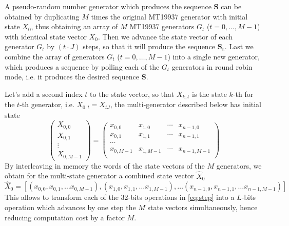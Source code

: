 \documentclass[preprint,1p,times]{elsarticle}
\begin{document}
\noindent A pseudo-random number generator which produces the sequence $\boldsymbol{S}$ can be obtained by duplicating $M$ times the original MT19937 generator with initial state $X_0$, thus obtaining an array of $M$ MT19937 generators $G_t$ ($t=0,\dots, M-1$) with identical state vector $X_0$. Then we advance the state vector of each generator $G_t$ by $(t\cdot J)$ steps, so that it will produce the sequence $\boldsymbol{S_t}$. Last we combine the array of generators $G_t$ ($t=0,\dots, M-1$) into a single new generator, which produces a sequence by polling each of the $G_t$ generators in round robin mode, i.e. it produces the desired sequence $\boldsymbol{S}$.

\noindent Let's add a second index $t$ to the state vector, so that $X_{k,t}$ is the state $k$-th for the $t$-th generator, i.e. $X_{0,t}=X_{tJ}$, the multi-generator described below has initial state
$$
\begin{pmatrix}
    X_{0,0} \\ X_{0,1} \\ \vdots \\ X_{0,M-1}
\end{pmatrix}
= 
\begin{pmatrix}
    x_{0,0} & x_{1,0} & \cdots & x_{n-1,0} \\
    x_{0,1} & x_{1,1} & \cdots & x_{n-1,1} \\
    \cdots \\
    x_{0,M-1} & x_{1,M-1} & \cdots & x_{n-1,M-1} \\
\end{pmatrix}
$$
By interleaving in memory the words of the state vectors of the $M$ generators, we obtain for the multi-state generator a combined state vector $\hat{X}_0$
$$
    \hat{X}_0 = [(x_{0,0}, x_{0,1}, \dots x_{0,M-1}), (x_{1,0}, x_{1,1}, \dots x_{1,M-1}), \dots (x_{n-1,0}, x_{n-1,1}, \dots x_{n-1,M-1})]
$$
This allows to transform each of the 32-bits operations in \eqref{eq:step} into a $L$-bits operation which advances by one step the $M$ state vectors simultaneously, hence reducing computation cost by a factor $M$.
\end{document}
